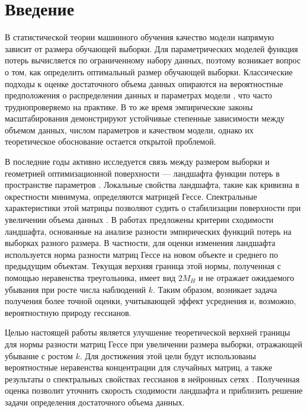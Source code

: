 \documentclass[11pt]{extarticle}
\begin{document}
\vspace{1cm}

\section{Введение}

В статистической теории машинного обучения \cite{Vapnik1995} качество модели напрямую зависит от размера обучающей выборки. Для параметрических моделей функция потерь вычисляется по ограниченному набору данных, поэтому возникает вопрос о том, как определить оптимальный размер обучающей выборки. Классические подходы к оценке достаточного объема данных опираются на вероятностные предположения о распределении данных и параметрах модели \cite{Motrenko2014, Bishop2006}, что часто труднопроверяемо на практике. В то же время эмпирические законы масштабирования \cite{Kaplan2020, Hoffmann2022} демонстрируют устойчивые степенные зависимости между объемом данных, числом параметров и качеством модели, однако их теоретическое обоснование остается открытой проблемой.

В последние годы активно исследуется связь между размером выборки и геометрией оптимизационной поверхности — ландшафта функции потерь в пространстве параметров \cite{Li2018, Fort2019}. Локальные свойства ландшафта, такие как кривизна в окрестности минимума, определяются матрицей Гессе. Спектральные характеристики этой матрицы позволяют судить о стабилизации поверхности при увеличении объема данных \cite{Papyan2019, Ghorbani2019, Granziol2021}. В работах \cite{Kiselev2024, Meshkov2024} предложены критерии сходимости ландшафта, основанные на анализе разности эмпирических функций потерь на выборках разного размера. В частности, для оценки изменения ландшафта используется норма разности матриц Гессе на новом объекте и среднего по предыдущим объектам. Текущая верхняя граница этой нормы, полученная с помощью неравенства треугольника, имеет вид \(2M_H\) и не отражает ожидаемого убывания при росте числа наблюдений \(k\). Таким образом, возникает задача получения более точной оценки, учитывающей эффект усреднения и, возможно, вероятностную природу гессианов.

Целью настоящей работы является улучшение теоретической верхней границы для нормы разности матриц Гессе при увеличении размера выборки, отражающей убывание с ростом \(k\). Для достижения этой цели будут использованы вероятностные неравенства концентрации для случайных матриц, а также результаты о спектральных свойствах гессианов в нейронных сетях \cite{Ghorbani2019, Granziol2021}. Полученная оценка позволит уточнить скорость сходимости ландшафта и приблизить решение задачи определения достаточного объема данных.
\end{document}
